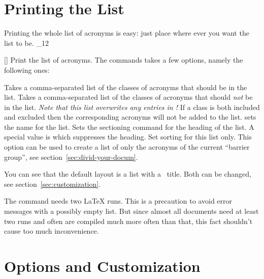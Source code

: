 \documentclass[load-preamble+]{cnltx-doc}
\makeatletter
\renewenvironment{commands}
  {%
    \cnltx@set@catcode_{12}%
    \let\command\cnltx@command
    \cnltxlist
  }
  {\endcnltxlist}
\makeatother
\begin{document}
\section{Printing the List}\label{sec:print_lists}
Printing the whole list of acronyms is easy: just place 
where ever you want the list to be.
\begin{commands}
  \command{printacronyms}[]
    Print the list of acronyms.
\end{commands}
The commands takes a few options, namely the following ones:
\begin{options}
    Takes a comma-separated list of the classes of acronyms that should be in
    the list.
    Takes a comma-separated list of the classes of acronyms that should
    \emph{not} be in the list.  \emph{Note that this list overwrites any
      entries in !} If a class is both included and
    excluded then the corresponding acronyms will not be added to the list.
    sets the name for the list.
    Sets the sectioning command for the heading of the list.  A special value
    is  which suppresses the heading. 
    Set sorting for this list only.
    This option can be used to create a list of only the
    acronyms of the current \enquote{barrier group}, see
    section~\ref{sec:divid-your-docum}.
\end{options}
\begin{example}
  \printacronyms[exclude-classes=city]
 
  \printacronyms[include-classes=city,name={City Acronyms}]
\end{example}

You can see that the default layout is a  list with a
\sarg\ title.  Both can be changed, see
section~\vref{sec:customization}.

The command  needs two \LaTeX{} runs.  This is a precaution
to avoid error messages with a possibly empty list.  But since almost all
documents need at least two runs and often are compiled much more often than
that, this fact shouldn't cause too much inconvenience.

\section{Options and Customization}\label{sec:customization}
\end{document}
